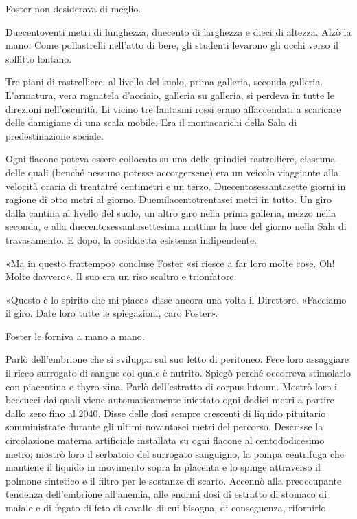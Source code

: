 \documentclass[
a5paper, %
10pt, %
twoside, 
onecolumn, %
openany, %
]{memoir}
\begin{document}
Foster non desiderava di meglio.

Duecentoventi metri di lunghezza, duecento di larghezza e dieci di altezza. Alzò la mano. Come pollastrelli nell’atto di bere, gli studenti levarono gli occhi verso il soffitto lontano.

Tre piani di rastrelliere: al livello del suolo, prima galleria, seconda galleria. L’armatura, vera ragnatela d’acciaio, galleria su galleria, si perdeva in tutte le direzioni nell’oscurità. Li vicino tre fantasmi rossi erano affaccendati a scaricare delle damigiane di una scala mobile. Era il montacarichi della Sala di predestinazione sociale.

Ogni flacone poteva essere collocato su una delle quindici rastrelliere, ciascuna delle quali (benché nessuno potesse accorgersene) era un veicolo viaggiante alla velocità oraria di trentatré centimetri e un terzo. Duecentosessantasette giorni in ragione di otto metri al giorno. Duemilacentotrentasei metri in tutto. Un giro dalla cantina al livello del suolo, un altro giro nella prima galleria, mezzo nella seconda, e alla duecentosessantasettesima mattina la luce del giorno nella Sala di travasamento. E dopo, la cosiddetta esistenza indipendente.

«Ma in questo frattempo» concluse Foster «si riesce a far loro molte cose. Oh! Molte davvero». Il suo era un riso scaltro e trionfatore.

«Questo è lo spirito che mi piace» disse ancora una volta il Direttore. «Facciamo il giro. Date loro tutte le spiegazioni, caro Foster».

Foster le forniva a mano a mano.

Parlò dell’embrione che si sviluppa sul suo letto di peritoneo. Fece loro assaggiare il ricco surrogato di sangue col quale è nutrito. Spiegò perché occorreva stimolarlo con piacentina e thyro-xina. Parlò dell’estratto di corpus luteum. Mostrò loro i beccucci dai quali viene automaticamente iniettato ogni dodici metri a partire dallo zero fino al 2040. Disse delle dosi sempre crescenti di liquido pituitario somministrate durante gli ultimi novantasei metri del percorso. Descrisse la circolazione materna artificiale installata su ogni flacone al centododicesimo metro; mostrò loro il serbatoio del surrogato sanguigno, la pompa centrifuga che mantiene il liquido in movimento sopra la placenta e lo spinge attraverso il polmone sintetico e il filtro per le sostanze di scarto. Accennò alla preoccupante tendenza dell’embrione all’anemia, alle enormi dosi di estratto di stomaco di maiale e di fegato di feto di cavallo di cui bisogna, di conseguenza, rifornirlo.
\end{document}
